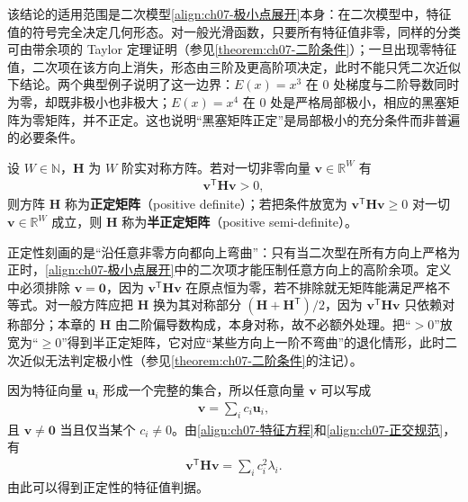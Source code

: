 \documentclass[../../main.tex]{subfiles}
\begin{document}
\begin{remark}
该结论的适用范围是二次模型\eqref{align:ch07-极小点展开}本身：在二次模型中，特征值的符号完全决定几何形态。对一般光滑函数，只要所有特征值非零，同样的分类可由带余项的 Taylor 定理证明（参见\cref{theorem:ch07-二阶条件}）；一旦出现零特征值，二次项在该方向上消失，形态由三阶及更高阶项决定，此时不能只凭二次近似下结论。两个典型例子说明了这一边界：$E(x)=x^{3}$ 在 $0$ 处梯度与二阶导数同时为零，却既非极小也非极大；$E(x)=x^{4}$ 在 $0$ 处是严格局部极小，相应的黑塞矩阵为零矩阵，并不正定。这也说明“黑塞矩阵正定”是局部极小的充分条件而非普遍的必要条件。
\end{remark}

\begin{definition}[正定矩阵]\label{definition:ch07-正定矩阵}
设 $W\in\mathbb{N}$，$\mathbf{H}$ 为 $W$ 阶实对称方阵。若对一切非零向量 $\mathbf{v}\in\mathbb{R}^{W}$ 有
\begin{align}
\mathbf{v}^{\mathsf T}\mathbf{H}\mathbf{v} > 0,
\label{align:ch07-正定二次型}
\end{align}
则方阵 $\mathbf{H}$ 称为\textbf{正定矩阵}（positive definite）；若把条件放宽为 $\mathbf{v}^{\mathsf T}\mathbf{H}\mathbf{v}\geqslant0$ 对一切 $\mathbf{v}\in\mathbb{R}^{W}$ 成立，则 $\mathbf{H}$ 称为\textbf{半正定矩阵}（positive semi-definite）。
\end{definition}

\begin{remark}
正定性刻画的是“沿任意非零方向都向上弯曲”：只有当二次型在所有方向上严格为正时，\eqref{align:ch07-极小点展开}中的二次项才能压制任意方向上的高阶余项。定义中必须排除 $\mathbf{v}=\mathbf{0}$，因为 $\mathbf{v}^{\mathsf T}\mathbf{H}\mathbf{v}$ 在原点恒为零，若不排除就无矩阵能满足严格不等式。对一般方阵应把 $\mathbf{H}$ 换为其对称部分 $(\mathbf{H}+\mathbf{H}^{\mathsf T})/2$，因为 $\mathbf{v}^{\mathsf T}\mathbf{H}\mathbf{v}$ 只依赖对称部分；本章的 $\mathbf{H}$ 由二阶偏导数构成，本身对称，故不必额外处理。把“$>0$”放宽为“$\geqslant0$”得到半正定矩阵，它对应“某些方向上一阶不弯曲”的退化情形，此时二次近似无法判定极小性（参见\cref{theorem:ch07-二阶条件}的注记）。
\end{remark}

因为特征向量 $\mathbf{u}_i$ 形成一个完整的集合，所以任意向量 $\mathbf{v}$ 可以写成
\begin{align}
\mathbf{v} = \sum_i c_i\mathbf{u}_i,
\label{align:ch07-向量展开}
\end{align}
且 $\mathbf{v}\neq\mathbf{0}$ 当且仅当某个 $c_i\neq0$。由\eqref{align:ch07-特征方程}和\eqref{align:ch07-正交规范}，有
\begin{align}
\mathbf{v}^{\mathsf T}\mathbf{H}\mathbf{v} = \sum_i c_i^{2}\lambda_i.
\label{align:ch07-正定二次型展开}
\end{align}
由此可以得到正定性的特征值判据。
\end{document}
